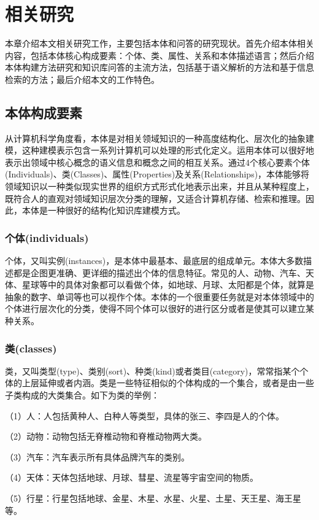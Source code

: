 \chapter{相关研究}
本章介绍本文相关研究工作，主要包括本体和问答的研究现状。首先介绍本体相关内容，包括本体核心构成要素：个体、类、属性、关系和本体描述语言；然后介绍本体构建方法研究和知识库问答的主流方法，包括基于语义解析的方法和基于信息检索的方法；最后介绍本文的工作特色。

\section{本体构成要素}
从计算机科学角度看，本体是对相关领域知识的一种高度结构化、层次化的抽象建模，这种建模表示包含一系列计算机可以处理的形式化定义\cite{Hitzler}。运用本体可以很好地表示出领域中核心概念的语义信息和概念之间的相互关系。通过4个核心要素个体(Individuals)、类(Classes)、属性(Properties)及关系(Relationships)，本体能够将领域知识以一种类似现实世界的组织方式形式化地表示出来，并且从某种程度上，既符合人的直观对领域知识层次分类的理解，又适合计算机存储、检索和推理。因此，本体是一种很好的结构化知识库建模方式。

\subsection{个体(individuals)}
个体，又叫实例(instances)，是本体中最基本、最底层的组成单元。本体大多数描述都是企图更准确、更详细的描述出个体的信息特征。常见的人、动物、汽车、天体、星球等中的具体对象都可以看做个体，如地球、月球、太阳都是个体，就算是抽象的数字、单词等也可以视作个体。本体的一个很重要任务就是对本体领域中的个体进行层次化的分类，使得不同个体可以很好的进行区分或者是使其可以建立某种关系。

\subsection{类(classes)}
类，又叫类型(type)、类别(sort)、种类(kind)或者类目(category)，常常指某个个体的上层延伸或者内涵。类是一些特征相似的个体构成的一个集合，或者是由一些子类构成的大类集合。如下为类的举例：

（1）人：人包括黄种人、白种人等类型，具体的张三、李四是人的个体。

（2）动物：动物包括无脊椎动物和脊椎动物两大类。

（3）汽车：汽车表示所有具体品牌汽车的类别。

（4）天体：天体包括地球、月球、彗星、流星等宇宙空间的物质。

（5）行星：行星包括地球、金星、木星、水星、火星、土星、天王星、海王星等。

